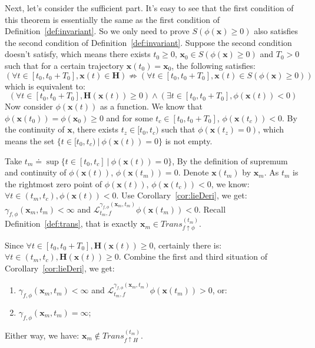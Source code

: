 \documentclass{jssc}
\begin{document}
Next, let's consider the sufficient part. It's easy to see that the first condition of this theorem is essentially the same as the first condition of Definition~\ref{def:invariant}. So we only need to prove $S(\phi(\boldsymbol{x}) \geq 0)$ also satisfies the second condition of Definition~\ref{def:invariant}. Suppose the second condition doesn't satisfy, which means there exists $t_0 \geq 0$, $\boldsymbol{x}_0 \in S(\phi(\boldsymbol{x}) \geq 0)$ and $T_0 > 0$ such that for a certain trajectory $\boldsymbol{x}(t_0) = \boldsymbol{x}_0$, the following satisfies: 
	\begin{equation*}
		(\forall t \in [t_0, t_0 + T_0], \boldsymbol{x}(t) \in \boldsymbol{H}) \nRightarrow (\forall t \in [t_0, t_0 + T_0], \boldsymbol{x}(t) \in S(\phi(\boldsymbol{x}) \geq 0))
	\end{equation*}
which is equivalent to: 
	\begin{equation*}
		(\forall t \in [t_0, t_0 + T_0], \boldsymbol{H}(\boldsymbol{x}(t)) \geq 0) \wedge (\exists t \in [t_0, t_0 + T_0], \phi(\boldsymbol{x}(t)) < 0)
	\end{equation*}
Now consider $\phi(\boldsymbol{x}(t))$ as a function. We know that $\phi(\boldsymbol{x}(t_0)) = \phi(\boldsymbol{x}_0) \geq 0$ and for some $t_c \in [t_0, t_0 + T_0]$, $\phi(\boldsymbol{x}(t_c)) < 0$. By the continuity of $\boldsymbol{x}$, there exists $t_z \in [t_0, t_c)$ such that $\phi(\boldsymbol{x}(t_z) = 0)$, which means the set $\{ t \in [t_0, t_c)\ |\ \phi(\boldsymbol{x}(t)) = 0 \}$ is not empty.

Take $t_m \doteq \sup\{t \in [t_0, t_c]\ |\ \phi (\boldsymbol{x}(t)) = 0 \}$, By the definition of supremum and continuity of $\phi(\boldsymbol{x}(t))$, $\phi(\boldsymbol{x}(t_m)) = 0$. Denote $\boldsymbol{x}(t_m)$ by $\boldsymbol{x}_m$. As $t_m$ is the rightmost zero point of $\phi(\boldsymbol{x}(t))$, $\phi(\boldsymbol{x}(t_c)) < 0$, we know: $\forall t \in (t_m, t_c),\phi(\boldsymbol{x}(t)) < 0$. Use Corollary~\ref{cor:lieDeri}, we get:  $\gamma_{f, \phi}(\boldsymbol{x}_m, t_m) < \infty$ and $\mathcal{L}_{t_m, f}^{\gamma_{f, \phi}(\boldsymbol{x}_m, t_m)} \phi (\boldsymbol{x}(t_m)) < 0$. Recall Definition~\ref{def:trans}, that is exactly $\boldsymbol{x}_m \in Trans_{f \uparrow \phi}^{(t_m)}$.

Since $\forall t \in [t_0, t_0 + T_0], \boldsymbol{H}(\boldsymbol{x}(t)) \geq 0$, certainly there is: $\forall t \in (t_m, t_c),\boldsymbol{H}(\boldsymbol{x}(t)) \geq 0$. Combine the first and third situation of Corollary~\ref{cor:lieDeri}, we get: 
\begin{enumerate}
	\item $\gamma_{f, \phi}(\boldsymbol{x}_m, t_m) < \infty$ and $\mathcal{L}_{t_m, f}^{\gamma_{f, \phi}(\boldsymbol{x}_m, t_m)} \phi (\boldsymbol{x}(t_m)) > 0$, or: 
	\item $\gamma_{f, \phi}(\boldsymbol{x}_m, t_m) = \infty$; 
\end{enumerate}
Either way, we have: $\boldsymbol{x}_m \notin Trans_{f \uparrow H}^{(t_m)}$.
\end{document}
